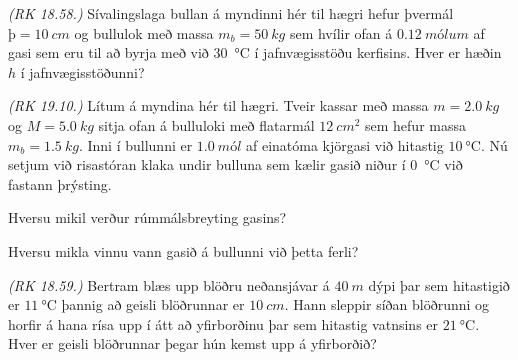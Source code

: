 \begin{enumerate}[label = \textbf{Dæmi \thechapter.\arabic*.}]
\begin{minipage}{\linewidth}
\item \textit{(RK 18.58.)} Sívalingslaga bullan á myndinni hér til hægri hefur þvermál $þ = \SI{10}{cm}$ og bullulok með massa $m_b = \SI{50}{kg}$ sem hvílir ofan á $\SI{0.12}{mólum}$ af gasi sem eru til að byrja með við \SI{30}{\celsius} í jafnvægisstöðu kerfisins. Hver er hæðin $h$ í jafnvægisstöðunni?

\item \textit{(RK 19.10.)} Lítum á myndina hér til hægri. Tveir kassar með massa $m = \SI{2.0}{kg}$ og $M = \SI{5.0}{kg}$ sitja ofan á bulluloki með flatarmál $\SI{12}{cm^2}$ sem hefur massa $m_b = \SI{1.5}{kg}$. Inni í bullunni er $\SI{1.0}{mól}$ af einatóma kjörgasi við hitastig $ \SI{10}{\celsius}$. Nú setjum við risastóran klaka undir bulluna sem kælir gasið niður í \SI{0}{\celsius} við fastann þrýsting. \begin{enumerate*}[label = \textbf{(\alph*)}]
\item Hversu mikil verður rúmmálsbreyting gasins?
\item Hversu mikla vinnu vann gasið á bullunni við þetta ferli?
\end{enumerate*}

\item \textit{(RK 18.59.)} Bertram blæs upp blöðru neðansjávar á $\SI{40}{m}$ dýpi þar sem hitastigið er $\SI{11}{\celsius}$ þannig að geisli blöðrunnar er $\SI{10}{cm}$. Hann sleppir síðan blöðrunni og horfir á hana rísa upp í átt að yfirborðinu þar sem hitastig vatnsins er $\SI{21}{\celsius}$. Hver er geisli blöðrunnar þegar hún kemst upp á yfirborðið?

\end{minipage}

\end{enumerate}
